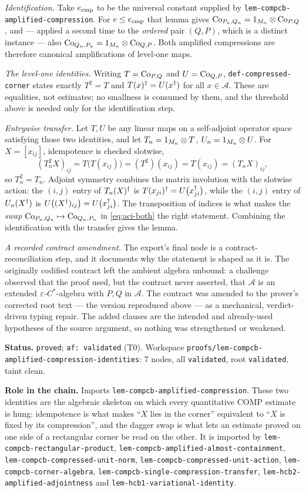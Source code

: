 \emph{Identification.} Take $e_{\mathrm{cmp}}$ to be the universal constant supplied
by \texttt{lem-compcb-amplified-compression}. For $e\le e_{\mathrm{cmp}}$ that
lemma gives $\mathrm{Co}_{P_n,Q_n}=1_{M_{n}}\otimes\mathrm{Co}_{P,Q}$, and --- applied a second time to the
\emph{ordered} pair $(Q,P)$, which is a distinct instance --- also
$\mathrm{Co}_{Q_n,P_n}=1_{M_{n}}\otimes\mathrm{Co}_{Q,P}$. Both amplified compressions are therefore canonical
amplifications of level-one maps.

\emph{The level-one identities.} Writing $T=\mathrm{Co}_{P,Q}$ and $U=\mathrm{Co}_{Q,P}$,
\texttt{def-compressed-corner} states exactly $T^2=T$ and $T(x)^{\dagger}=U(x^{\dagger})$ for all
$x\in\mathcal A$. These are equalities, not estimates; no smallness is consumed by them,
and the threshold above is needed only for the identification step.

\emph{Entrywise transfer.} Let $T,U$ be any linear maps on a self-adjoint operator space
satisfying those two identities, and let $T_n=1_{M_{n}}\otimes T$, $U_n=1_{M_{n}}\otimes U$. For
$X=[x_{ij}]$, idempotence is checked slotwise,
\[
  (T_n^2X)_{ij}=T\bigl(T(x_{ij})\bigr)=(T^2)(x_{ij})=T(x_{ij})=(T_nX)_{ij},
\]
so $T_n^2=T_n$. Adjoint symmetry combines the matrix involution with the slotwise action:
the $(i,j)$ entry of $T_n(X)^{\dagger}$ is $T(x_{ji})^{\dagger}=U\bigl(x_{ji}^{\dagger}\bigr)$, while the
$(i,j)$ entry of $U_n(X^{\dagger})$ is $U\bigl((X^{\dagger})_{ij}\bigr)=U\bigl(x_{ji}^{\dagger}\bigr)$. The
transposition of indices is what makes the \emph{swap} $\mathrm{Co}_{P_n,Q_n}\mapsto\mathrm{Co}_{Q_n,P_n}$
in \eqref{eq:aci-both} the right statement. Combining the identification with the transfer
gives the lemma.

\emph{A recorded contract amendment.} The export's final node is a contract-reconciliation
step, and it documents why the statement is shaped as it is. The originally codified
contract left the ambient algebra unbound: a challenge observed that the proof used, but
the contract never asserted, that $\mathcal A$ is an extended $\varepsilon$-$C^*$-algebra with
$P,Q$ in $\mathcal A$. The contract was amended to the prover's corrected root text ---
the version reproduced above --- as a mechanical, verdict-driven typing repair. The added
clauses are the intended and already-used hypotheses of the source argument, so nothing
was strengthened or weakened.

\medskip
\noindent\textbf{Status.} \texttt{proved}; \texttt{af: validated} (T0). Workspace
\texttt{proofs/lem-compcb-amplified-compression-identities}: 7 nodes, all
\texttt{validated}, root \texttt{validated}, taint clean.

\noindent\textbf{Role in the chain.} Imports
\texttt{lem-compcb-amplified-compression}. These two identities are the algebraic
skeleton on which every quantitative COMP estimate is hung: idempotence is what makes
``$X$ lies in the corner'' equivalent to ``$X$ is fixed by its compression'', and the
dagger swap is what lets an estimate proved on one side of a rectangular corner be read
on the other. It is imported by \texttt{lem-compcb-rectangular-product},
\texttt{lem-compcb-amplified-almost-containment},
\texttt{lem-compcb-compressed-unit-norm},
\texttt{lem-compcb-compressed-unit-action},
\texttt{lem-compcb-corner-algebra},
\texttt{lem-compcb-single-compression-transfer},
\texttt{lem-hcb2-amplified-adjointness} and
\texttt{lem-hcb1-variational-identity}.
